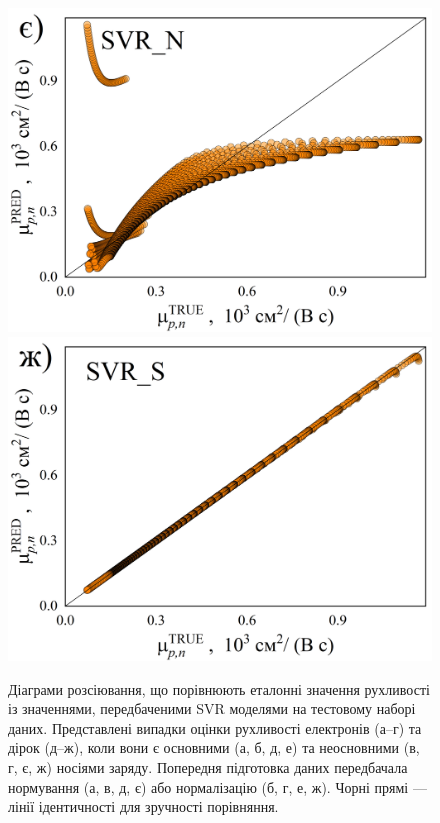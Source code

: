 \documentclass[12pt,a4paper,titlepage,oneside]{book}
\numberwithin{equation}{part}
\begin{document}
\begin{figure}
     \includegraphics[width=0.35\linewidth]{SVRNpn.png}\kern 20pt
     \includegraphics[width=0.35\linewidth]{SVRSpn.png}
	  \caption{Діаграми розсіювання, що порівнюють еталонні значення рухливості із значеннями, передбаченими SVR моделями
       на тестовому наборі даних.
       Представлені випадки оцінки рухливості електронів (а--г) та дірок (д--ж), коли вони є
       основними (а, б, д, е) та неосновними (в, г, є, ж) носіями заряду.
       Попередня підготовка даних передбачала нормування (а, в, д, є) або нормалізацію (б, г, е, ж).
       Чорні прямі --- лінії ідентичності для зручності порівняння.
}\label{figSVR}
\end{figure}
\end{document}

